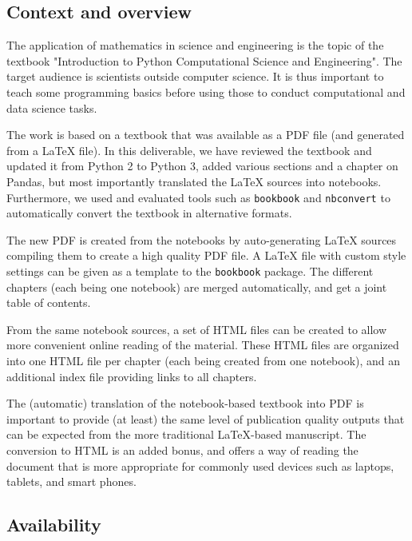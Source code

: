 \documentclass{deliverablereport}
\begin{document}
\subsection{Context and overview}


The application of mathematics in science and engineering is the topic
of the textbook "Introduction to Python Computational Science and
Engineering".
%
The target audience is scientists outside computer science. It is
thus important to teach some programming basics before using those to
conduct computational and data science tasks.

The work is based on a textbook that was available as a PDF file (and
generated from a \LaTeX{} file). In this deliverable, we have reviewed
the textbook and updated it from Python 2 to Python 3, added various
sections and a chapter on Pandas, but most importantly translated the
\LaTeX{} sources into \Jupyter notebooks. Furthermore, we used and
evaluated tools such as \texttt{bookbook} and \texttt{nbconvert} to
automatically convert the textbook in alternative formats.

The new PDF is created from the \Jupyter notebooks by auto-generating
\LaTeX{} sources compiling them to create a high quality PDF file. A
\LaTeX{} file with custom style settings can be given as a template to
the \texttt{bookbook} package. The different chapters (each being one
notebook) are merged automatically, and get a joint table of contents.

From the same \Jupyter notebook sources, a set of HTML files can be
created to allow more convenient online reading of the material. These
HTML files are organized into one HTML file per chapter (each being
created from one notebook), and an additional index file providing
links to all chapters.

The (automatic) translation of the \Jupyter notebook-based textbook
into PDF is important to provide (at least) the same level of
publication quality outputs that can be expected from the more
traditional \LaTeX{}-based manuscript. The conversion to HTML is an
added bonus, and offers a way of reading the document that is more
appropriate for commonly used devices such as laptops, tablets, and
smart phones.


\subsection{Availability}
\end{document}

